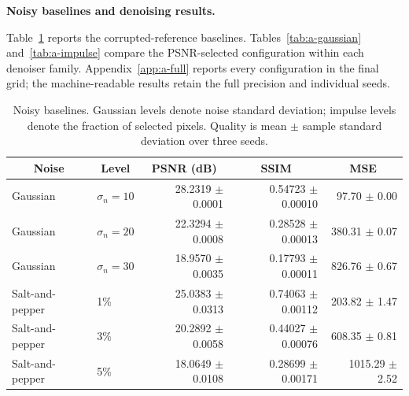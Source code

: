 \documentclass[a4paper,12pt]{article}
\begin{document}
\textbf{Noisy baselines and denoising results.}\par
Table~\ref{tab:a-baselines} reports the corrupted-reference baselines. Tables~\ref{tab:a-gaussian} and~\ref{tab:a-impulse} compare the PSNR-selected configuration within each denoiser family. Appendix~\ref{app:a-full} reports every configuration in the final grid; the machine-readable results retain the full precision and individual seeds.
\begin{table}[htbp]
\centering
\small
\setlength{\tabcolsep}{3pt}
\caption{Noisy baselines. Gaussian levels denote noise standard deviation; impulse levels denote the fraction of selected pixels. Quality is mean $\pm$ sample standard deviation over three seeds.}
\label{tab:a-baselines}
\begin{tabular}{llrrr}
\toprule
\multicolumn{1}{c}{Noise} & \multicolumn{1}{c}{Level} & \multicolumn{1}{c}{PSNR (dB)} & \multicolumn{1}{c}{SSIM} & \multicolumn{1}{c}{MSE} \\
\midrule
Gaussian & $\sigma_n=10$ & 28.2319 $\pm$ 0.0001 & 0.54723 $\pm$ 0.00010 & 97.70 $\pm$ 0.00 \\
Gaussian & $\sigma_n=20$ & 22.3294 $\pm$ 0.0008 & 0.28528 $\pm$ 0.00013 & 380.31 $\pm$ 0.07 \\
Gaussian & $\sigma_n=30$ & 18.9570 $\pm$ 0.0035 & 0.17793 $\pm$ 0.00011 & 826.76 $\pm$ 0.67 \\
Salt-and-pepper & 1\% & 25.0383 $\pm$ 0.0313 & 0.74063 $\pm$ 0.00112 & 203.82 $\pm$ 1.47 \\
Salt-and-pepper & 3\% & 20.2892 $\pm$ 0.0058 & 0.44027 $\pm$ 0.00076 & 608.35 $\pm$ 0.81 \\
Salt-and-pepper & 5\% & 18.0649 $\pm$ 0.0108 & 0.28699 $\pm$ 0.00171 & 1015.29 $\pm$ 2.52 \\
\bottomrule
\end{tabular}
\end{table}
\end{document}
